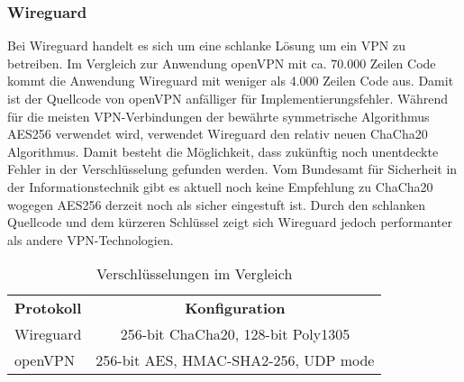 \newpage
\subsubsection{Wireguard}

Bei Wireguard handelt es sich um eine schlanke L\"osung um ein \ac{VPN} zu betreiben. Im Vergleich zur Anwendung openVPN mit ca. 70.000 Zeilen Code kommt die Anwendung Wireguard mit weniger als 4.000 Zeilen Code aus. 
Damit ist der Quellcode von openVPN anf\"alliger f\"ur Implementierungsfehler. W\"ahrend f\"ur die meisten VPN-Verbindungen der bew\"ahrte symmetrische Algorithmus AES256 verwendet wird, verwendet Wireguard den relativ neuen ChaCha20 Algorithmus. Damit besteht die M\"oglichkeit, dass zuk\"unftig noch unentdeckte Fehler in der Verschl\"usselung gefunden werden. Vom Bundesamt f\"ur Sicherheit in der Informationstechnik gibt es aktuell noch keine Empfehlung zu ChaCha20 wogegen AES256 derzeit noch als sicher eingestuft ist.  
Durch den schlanken Quellcode und dem k\"urzeren Schl\"ussel zeigt sich Wireguard jedoch performanter als andere VPN-Technologien.   

\begin{table}[ht]
   \begin{center}
      \begin{tabular}{lc}\toprule
         \textbf{Protokoll}	&\textbf{Konfiguration} \\ 	
         Wireguard	& 256-bit ChaCha20, 128-bit Poly1305 \\
         openVPN	& 256-bit AES, HMAC-SHA2-256, UDP mode \\
      \end{tabular}
   \end{center}
   \caption{Verschlüsselungen im Vergleich}
\end{table}

